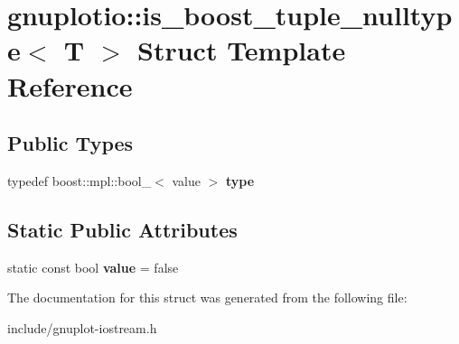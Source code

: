 \hypertarget{structgnuplotio_1_1is__boost__tuple__nulltype}{}\section{gnuplotio\+:\+:is\+\_\+boost\+\_\+tuple\+\_\+nulltype$<$ T $>$ Struct Template Reference}
\label{structgnuplotio_1_1is__boost__tuple__nulltype}
\subsection*{Public Types}
\begin{DoxyCompactItemize}
\item 
\mbox{\label{structgnuplotio_1_1is__boost__tuple__nulltype_a6b9e2eaadcaa5c788131d4e9e4186349}} 
typedef boost\+::mpl\+::bool\+\_\+$<$ value $>$ {\bfseries type}
\end{DoxyCompactItemize}
\subsection*{Static Public Attributes}
\begin{DoxyCompactItemize}
\item 
\mbox{\label{structgnuplotio_1_1is__boost__tuple__nulltype_aed42a98e58eb94c7ba55ea7d2a8f7fd2}} 
static const bool {\bfseries value} = false
\end{DoxyCompactItemize}


The documentation for this struct was generated from the following file\+:\begin{DoxyCompactItemize}
\item 
include/gnuplot-\/iostream.\+h\end{DoxyCompactItemize}
